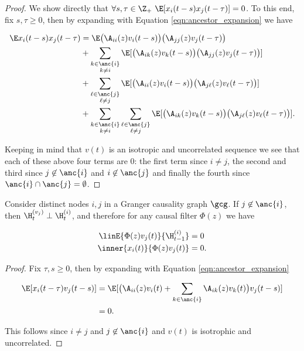 \begin{proof}
  We show directly that
  $\forall s, \tau \in \Z_+\ \E[x_i(t - s)x_j(t - \tau)] = 0$.  To this end, fix
  $s, \tau \ge 0$, then by expanding with Equation
  \eqref{eqn:ancestor_expansion} we have

  \begin{align*}
    \E x_i(t - s)x_j(t - \tau)
    &= \E \big(\A_{ii}(z)v_i(t - s)\big)\big(\A_{jj}(z)v_j(t - \tau)\big)\\
    &+ \sum_{\substack{k \in \anc{i} \\ k \ne i}}\E[\big(\A_{ik}(z)v_k(t - s)\big)\big(\A_{jj}(z)v_j(t - \tau)\big)]\\
    &+ \sum_{\substack{\ell \in \anc{j} \\ \ell \ne j}}\E[\big(\A_{ii}(z)v_i(t - s)\big) \big(\A_{j\ell}(z) v_\ell(t - \tau)\big)]\\
    &+ \sum_{\substack{k \in \anc{i} \\ k \ne i}}\sum_{\substack{\ell \in \anc{j} \\ \ell \ne j}}\E[\big(\A_{ik}(z)v_k(t - s)\big)\big(\A_{j\ell}(z)v_\ell(t - \tau)\big)].
  \end{align*}
  
  Keeping in mind that $v(t)$ is an isotropic and uncorrelated
  sequence we see that each of these above four terms are 0: the
  first term since $i \ne j$, the second and third since
  $j \not\in \anc{i}$ and $i \not\in \anc{j}$ and finally the fourth since
  $\anc{i} \cap \anc{j} = \emptyset$.
\end{proof}

\begin{lemma}
  \label{lem:vj_perp}
  Consider distinct nodes $i, j$ in a Granger causality graph $\gcg$.
  If $j \not \in \anc{i}$, then $\H_t^{(v_j)} \perp \H_{t}^{(i)}$, and therefore
  for any causal filter $\Phi(z)$ we have

  \begin{align*}
    \linE{\Phi(z)v_j(t)}{\H_{t - 1}^{(i)}} &= 0\\
    \inner{x_i(t)}{\Phi(z)v_j(t)} & = 0.
  \end{align*}
\end{lemma}
\begin{proof}
  Fix $\tau, s \ge 0$, then by expanding with Equation \eqref{eqn:ancestor_expansion}

  \begin{align*}
    \E[x_i(t - \tau)v_j(t - s)] &= \E[\big(\A_{ii}(z)v_i(t) + \sum_{k \in \anc{i}}\A_{ik}(z)v_k(t) \big) v_j(t - s)]\\
    &= 0.
  \end{align*}

  This follows since $i \ne j$ and $j \not \in \anc{i}$ and $v(t)$ is
  isotrophic and uncorrelated.
\end{proof}

